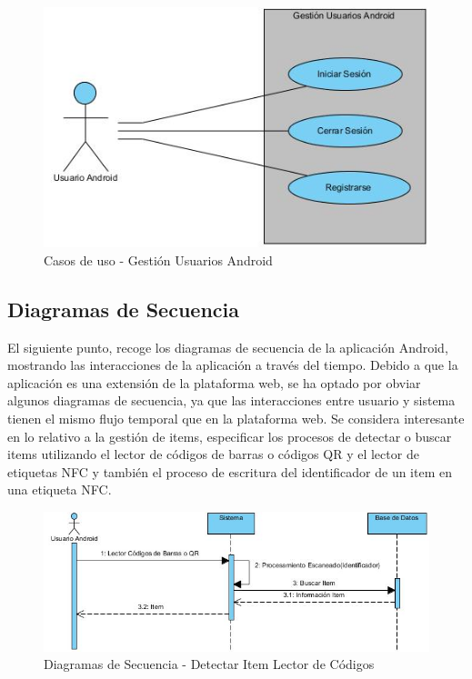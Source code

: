 \documentclass[a4paper,11pt]{book}
\begin{document}
\begin{figure}[H]  
\centering 
\includegraphics[scale=0.7]{imagenes/casosUso/gestion_usuarios_android.jpg}
\caption{ Casos de uso - Gestión Usuarios Android\cite{diagrama}  }  
\end{figure}


\subsection{Diagramas de Secuencia}
El siguiente punto, recoge los diagramas de secuencia de la aplicación Android,  mostrando las interacciones de la aplicación a través del tiempo. Debido a que la aplicación es una extensión de la plataforma web, se ha optado por obviar algunos diagramas de secuencia, ya que las interacciones entre usuario y sistema tienen el mismo flujo temporal que en la plataforma web. Se considera interesante en lo relativo a la gestión de items, especificar los procesos de detectar o buscar items utilizando el lector de códigos de barras o códigos QR y el lector de etiquetas NFC y también el proceso de escritura del identificador de un item en una etiqueta NFC. 

\begin{figure}[H] 
\centering 
\includegraphics[scale=0.50]{imagenes/secuencia/android/detectar_item_qr_barras.jpg}
\caption{ Diagramas de Secuencia - Detectar Item Lector de Códigos\cite{diagrama}  }  
\end{figure}
\end{document}
